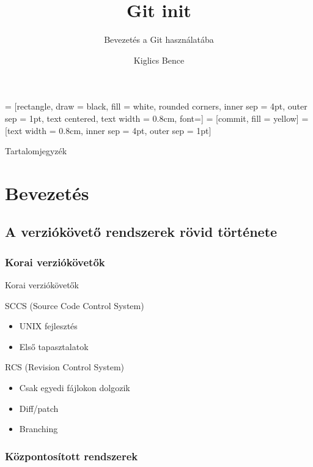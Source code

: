 \documentclass[display,t]{beamer}
\title{Git init}
\subtitle{Bevezetés a Git használatába}
\author{Kiglics Bence}
\begin{document}
 = [rectangle, draw = black, fill = white, rounded corners,
                      inner sep = 4pt, outer sep = 1pt, text centered,
                      text width = 0.8cm, font=\small]
 = [commit, fill = yellow]
 = [text width = 0.8cm, inner sep = 4pt, outer sep = 1pt]


\frame{\titlepage}

\begin{frame}{Tartalomjegyzék}
    \tableofcontents
\end{frame}

\section{Bevezetés}
\subsection{A verziókövető rendszerek rövid története}
\subsubsection{Korai verziókövetők}

\begin{frame}{Korai verziókövetők}
    \pause
    \begin{block}{SCCS (Source Code Control System)}
        \begin{itemize}
            \pause \item UNIX fejlesztés
            \pause \item Első tapasztalatok
        \end{itemize}
    \end{block}
    \pause
    \begin{block}{RCS (Revision Control System)}
        \begin{itemize}
            \pause \item Csak egyedi fájlokon dolgozik
            \pause \item Diff/patch
            \pause \item Branching
        \end{itemize}
    \end{block}
\end{frame}

\subsubsection{Központosított rendszerek}
\end{document}
